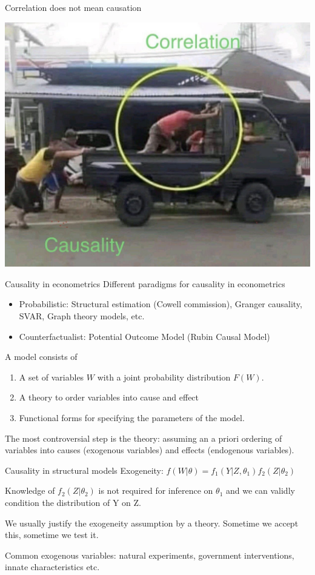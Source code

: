 \documentclass[handout]{beamer}
\begin{document}
\begin{frame}{Correlation does not mean causation}
	\begin{center}
		\includegraphics[width=.75\linewidth]{./Figures/corrvscause.jpg}
	\end{center}
\end{frame}

\begin{frame}{Causality in econometrics}
Different paradigms for causality in econometrics
\begin{itemize}
	\item Probabilistic: Structural estimation (Cowell commission), Granger causality, SVAR, Graph theory models, etc.
	\item Counterfactualist: Potential Outcome Model (Rubin Causal Model)
\end{itemize}\bigskip


A model consists of 
\begin{enumerate}
	\item A set of variables $W$ with a joint probability distribution $F(W)$.
	\item A theory to order variables into cause and effect
	\item Functional forms for specifying the parameters of the model.
\end{enumerate}\bigskip
The most controversial step is the theory: assuming an a priori ordering of variables into causes (exogenous variables) and effects (endogenous variables).
\end{frame}

\begin{frame}{Causality in structural models}
Exogeneity: $f(W|\theta)=f_1(Y|Z,\theta_1)f_2(Z|\theta_2)$\medskip

Knowledge of $f_2(Z|\theta_2)$ is not required for inference on $\theta_1$ and we can validly condition the distribution of Y on Z.\bigskip

We usually justify the exogeneity assumption by a theory. Sometime we accept this, sometime we test it.\medskip

Common exogenous variables: natural experiments, government interventions, innate characteristics etc.

\end{frame}
\end{document}
